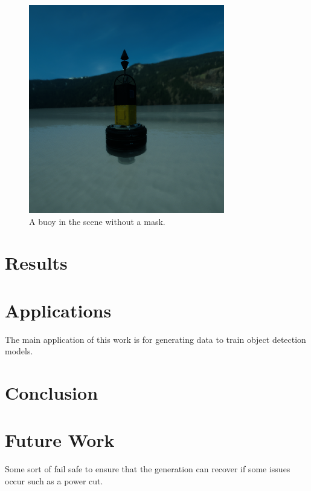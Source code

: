 \documentclass[10pt,twocolumn,letterpaper]{article}
\begin{document}
\begin{figure}[t]
    \centering
    \includegraphics[width=\linewidth]{images/buoy_without_mask.png}
    \caption{A buoy in the scene without a mask.}
    \label{fig:buoy_without_mask}
\end{figure}

\section{Results}




\section{Applications}

The main application of this work is for generating data to train object detection models. 

\section{Conclusion}

\section{Future Work}

Some sort of fail safe to ensure that the generation can recover if some issues occur such as a power cut.

{
    \small
    
    
}

% 
\end{document}
